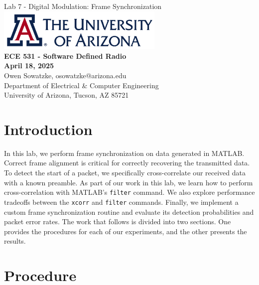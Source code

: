 \documentclass{article}
\begin{document}
\begin{titlepage}
	\centering
	{\huge Lab 7 - Digital Modulation: Frame Synchronization}\\[0.25 in]
	\includegraphics[width=0.6\textwidth]{ua_logo.png}\\[0.25 in]
	{\large \textbf{ECE 531 - Software Defined Radio\\[0.25 in]
	April 18, 2025\\[0.25 in]}}
	{\large Owen Sowatzke, osowatzke@arizona.edu\\[0.05 in]
	Department of Electrical \& Computer Engineering\\[0.05 in]
	University of Arizona, Tucson, AZ 85721\\[0.5 in]}
	\hypersetup{linkcolor=navy-blue}
	\noindent\hrulefill
	\tableofcontents
	\noindent\hrulefill
\end{titlepage}


\section{Introduction}

In this lab, we perform frame synchronization on data generated in MATLAB. Correct frame alignment is critical for correctly recovering the transmitted data. To detect the start of a packet, we specifically cross-correlate our received data with a known preamble. As part of our work in this lab, we learn how to perform cross-correlation with MATLAB's \texttt{filter} command. We also explore performance tradeoffs between the \texttt{xcorr} and \texttt{filter} commands. Finally, we implement a custom frame synchronization routine and evaluate its detection probabilities and packet error rates. The work that follows is divided into two sections. One provides the procedures for each of our experiments, and the other presents the results.

\section{Procedure}
\end{document}
